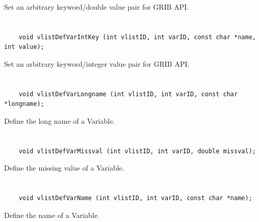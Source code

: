 Set an arbitrary keyword/double value pair for GRIB API.


\section*{\tt {}}

\begin{verbatim}
    void vlistDefVarIntKey (int vlistID, int varID, const char *name, int value);
\end{verbatim}

Set an arbitrary keyword/integer value pair for GRIB API.


\section*{\tt {}}

\begin{verbatim}
    void vlistDefVarLongname (int vlistID, int varID, const char *longname);
\end{verbatim}

Define the long name of a Variable.


\section*{\tt {}}

\begin{verbatim}
    void vlistDefVarMissval (int vlistID, int varID, double missval);
\end{verbatim}

Define the missing value of a Variable.


\section*{\tt {}}

\begin{verbatim}
    void vlistDefVarName (int vlistID, int varID, const char *name);
\end{verbatim}

Define the name of a Variable.


\section*{\tt {}}

